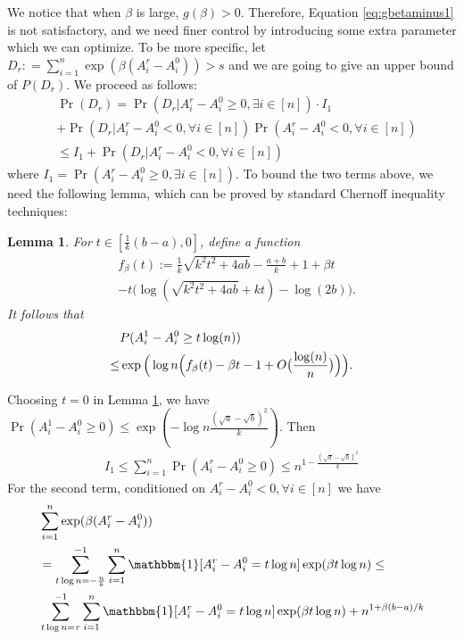 \documentclass[conference]{IEEEtran}
\newtheorem{lemma}{Lemma}
\begin{document}
We notice that when $\beta$ is large, $g(\beta) > 0$. Therefore, Equation \eqref{eq:gbetaminus1} is not satisfactory, and
we need finer control by introducing some extra parameter which we can optimize. To be more specific, let $D_r : = \sum_{i=1}^n\exp ( \beta(A^r_i-A^0_i)) > s$
and we are going to give an upper bound of $P(D_r)$. We proceed as follows: 
\begin{align*}
&\Pr(D_r) = 
\Pr(D_r| A_i^r - A_i^0 \geq 0, \exists i\in [n])
\cdot I_1 \\
&+ \Pr(D_r | A_i^r - A_i^0  < 0, \forall i\in [n])
\Pr(  A_i^r - A_i^0  < 0 , \forall i \in [n] ) \\
& \leq I_1
+ \Pr(D_r | A_i^r - A_i^0  < 0, \forall i\in [n])
\end{align*}
where $I_1 = \Pr( A_i^r - A_i^0 \geq 0, \exists i\in [n])$.
To bound the two terms above, we need the following lemma, which can be proved by standard Chernoff inequality techniques:
\begin{lemma}\label{lem:fb}
	For $t\in [\frac{1}{k}(b-a), 0]$,
define a function
\begin{align*}
&f_{\beta}(t):=\frac{1}{k}\sqrt{k^2t^2+4ab} -\frac{a+b}{k} +1 +\beta t  \\
&-t\big(\log(\sqrt{k^2t^2+4ab}+kt)-\log(2b) \big).
\end{align*}
It follows that
\begin{align} \label{eq:upba}
& P(A^1_i-A^0_i\ge t\log(n))  \notag\\
\le &  \exp\Big(\log n \Big(f_{\beta}(t) -\beta t  - 1 + O\big(\frac{\log(n)}{n}\big) \Big)\Big) .
\end{align}
\end{lemma}
Choosing $t=0$ in Lemma \ref{lem:fb}, we have
$\Pr(A^1_i-A^0_i\ge 0 ) \leq \exp(-\log n \frac{(\sqrt{a}-\sqrt{b})^2}{k})$.
Then
\begin{align*}
I_1 \leq \sum_{i=1}^n \Pr( A_i^r - A_i^0 \geq 0) \leq n^{1-\frac{(\sqrt{a}-\sqrt{b})^2}{k}}
\end{align*}
For the second term,
conditioned on $A_i^r - A_i^0  < 0, \forall i\in [n]$ we have
\begin{align*}
&\sum_{i=1}^n\exp ( \beta(A^r_i-A^0_i)) \\
& = \sum_{t\log n =-\frac{n}{k}}^{-1}\sum_{i=1}^n \mathbbm{1}[A^r_i - A^0_i = t \log n] \exp ( \beta  t\log n)\leq \\ 
&
\sum_{t\log n =\tau}^{-1}\sum_{i=1}^n \mathbbm{1}[A^r_i - A^0_i = t \log n]\exp ( \beta  t\log n) + n^{1+\beta(b-a)/k}
\end{align*}
\end{document}
